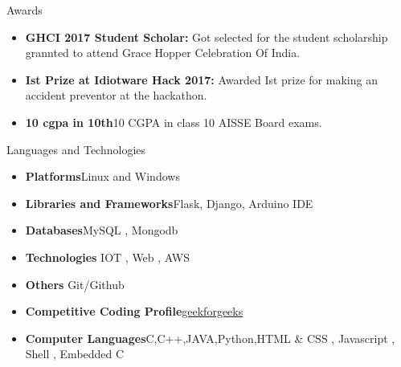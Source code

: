 \documentclass[]{mcdowellcv}
\begin{document}
	\begin{cvsection}{Awards}
		\begin{cvsubsection}{}{}{}	
			\begin{itemize}
				\item \textbf{GHCI 2017 Student Scholar:} Got selected for the student scholarship grannted to attend Grace Hopper Celebration Of India.
				\item \textbf{Ist Prize at Idiotware Hack 2017:} Awarded Ist prize for making an accident preventor at the hackathon.
				\item \textbf{10 cgpa in 10th}10 CGPA in class 10 AISSE Board exams.
			\end{itemize}
		\end{cvsubsection}
	\end{cvsection}
	
	\begin{cvsection}{Languages and Technologies}
		\begin{cvsubsection}{}{}{}	
			\begin{itemize}
				\item \textbf{Platforms}Linux and Windows
				\item \textbf{Libraries and Frameworks}Flask, Django, Arduino IDE
				\item \textbf{Databases}MySQL , Mongodb
				\item \textbf{Technologies} IOT , Web , AWS
				\item \textbf{Others} Git/Github
				\item \textbf{Competitive Coding Profile}\href{auth.geeksforgeeks.org/profile.php?user=techo&list=practice}{geekforgeeks}
				\item \textbf{Computer Languages}C,C++,JAVA,Python,HTML & CSS , Javascript , Shell , Embedded C
			\end{itemize}
		\end{cvsubsection}
	\end{cvsection}
	
\end{document}
